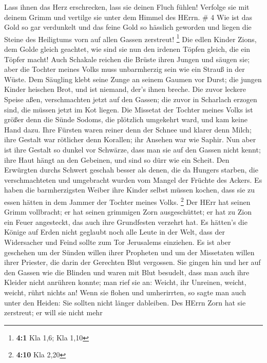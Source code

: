  Lass ihnen das Herz erschrecken, lass sie deinen Fluch
fühlen!  Verfolge sie mit deinem Grimm und vertilge sie
unter dem Himmel des HErrn. \# 4  Wie ist das Gold so gar
verdunkelt und das feine Gold so hässlich geworden und liegen die Steine
des Heiligtums vorn auf allen Gassen zerstreut! \footnote{\textbf{4:1}
  Kla 1,6; Kla 1,10}  Die edlen Kinder Zions, dem Golde
gleich geachtet, wie sind sie nun den irdenen Töpfen gleich, die ein
Töpfer macht!  Auch Schakale reichen die Brüste ihren Jungen
und säugen sie; aber die Tochter meines Volks muss unbarmherzig sein wie
ein Strauß in der Wüste.  Dem Säugling klebt seine Zunge an
seinem Gaumen vor Durst; die jungen Kinder heischen Brot, und ist
niemand, der's ihnen breche.  Die zuvor leckere Speise aßen,
verschmachten jetzt auf den Gassen; die zuvor in Scharlach erzogen sind,
die müssen jetzt im Kot liegen.  Die Missetat der Tochter
meines Volks ist größer denn die Sünde Sodoms, die plötzlich umgekehrt
ward, und kam keine Hand dazu.  Ihre Fürsten waren reiner
denn der Schnee und klarer denn Milch; ihre Gestalt war rötlicher denn
Korallen; ihr Ansehen war wie Saphir.  Nun aber ist ihre
Gestalt so dunkel vor Schwärze, dass man sie auf den Gassen nicht kennt;
ihre Haut hängt an den Gebeinen, und sind so dürr wie ein Scheit.
 Den Erwürgten durchs Schwert geschah besser als denen, die
da Hungers starben, die verschmachteten und umgebracht wurden vom Mangel
der Früchte des Ackers.  Es haben die barmherzigsten Weiber
ihre Kinder selbst müssen kochen, dass sie zu essen hätten in dem Jammer
der Tochter meines Volks. \footnote{\textbf{4:10} Kla 2,20}
 Der HErr hat seinen Grimm vollbracht; er hat seinen
grimmigen Zorn ausgeschüttet; er hat zu Zion ein Feuer angesteckt, das
auch ihre Grundfesten verzehrt hat.  Es hätten's die Könige
auf Erden nicht geglaubt noch alle Leute in der Welt, dass der
Widersacher und Feind sollte zum Tor Jerusalems einziehen. 
Es ist aber geschehen um der Sünden willen ihrer Propheten und um der
Missetaten willen ihrer Priester, die darin der Gerechten Blut
vergossen.  Sie gingen hin und her auf den Gassen wie die
Blinden und waren mit Blut besudelt, dass man auch ihre Kleider nicht
anrühren konnte;  man rief sie an: Weicht, ihr Unreinen,
weicht, weicht, rührt nichts an! Wenn sie flohen und umherirrten, so
sagte man auch unter den Heiden: Sie sollten nicht länger dableiben.
 Des HErrn Zorn hat sie zerstreut; er will sie nicht mehr
